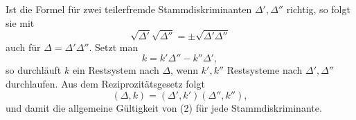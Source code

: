 \documentclass[11pt]{article}
\begin{document}
Ist die Formel für zwei teilerfremde Stammdiskriminanten \(\Delta',\Delta''\) richtig, so folgt sie mit
\begin{equation}
        \sqrt{\Delta'}\sqrt{\Delta''}=\pm\sqrt{\Delta'\Delta''}
\tag{3}
\end{equation}
auch für \(\Delta=\Delta'\Delta''\).  Setzt man
\[
        k=k'\Delta''-k''\Delta',
\]
so durchläuft \(k\) ein Restsystem nach \(\Delta\), wenn \(k',k''\) Restsysteme nach \(\Delta',\Delta''\) durchlaufen.  Aus dem Reziprozitätsgesetz folgt
\[
        (\Delta,k)=(\Delta',k')(
\Delta'',k''),
\]
und damit die allgemeine Gültigkeit von (2) für jede Stammdiskriminante.
\end{document}
